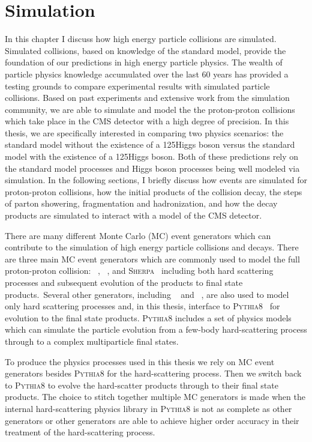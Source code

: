 \chapter{Simulation}
\label{sec:simulation}
In this chapter I discuss how high energy particle
collisions are simulated. Simulated collisions, based on knowledge of the standard model, provide 
the foundation of our predictions in high energy particle physics. 
The wealth of particle physics knowledge accumulated over the last 
60 years has provided a testing grounds to compare experimental results with
simulated particle collisions. Based on past experiments and extensive work from the simulation community,
we are able to simulate and model the the proton-proton collisions which take place in the
CMS detector with a high degree of precision. 
In this thesis, we are specifically interested in comparing two physics scenarios: the standard model 
without the existence of a 125\GeV Higgs boson versus the standard model with the existence
of a 125\GeV Higgs boson. Both of these predictions rely on the standard model processes and
Higgs boson processes being well modeled via simulation.
In the following sections, I briefly discuss how events are simulated for proton-proton collisions,
how the initial products of the collision decay, the steps of parton showering,
fragmentation and hadronization, and how the decay products are simulated
to interact with a model of the CMS detector.

There are many different Monte Carlo (MC) event generators which can contribute to the 
simulation of high energy particle collisions and decays. There are three main MC event
generators which are commonly used to model the full proton-proton collision: 
\PYTHIA~\cite{Sjostrand:2014zea}, \HERWIG~\cite{Bahr:2008pv}, and \textsc{Sherpa}~\cite{Gleisberg:2008ta}
including both hard scattering processes and subsequent evolution of the products to final 
state products. Several other generators, including \POWHEG~\cite{Alioli:2010xd,Frixione:2007vw}
and \MGAMCNLO~\cite{Alwall:2011uj,Alwall:2014hca}, 
are also used to model only hard scattering processes and, in this thesis, 
interface to \textsc{Pythia8}~\cite{Sjostrand:2014zea} for evolution to the final state products.
\textsc{Pythia8} includes a set of physics models
which can simulate the particle evolution from a few-body hard-scattering process through
to a complex multiparticle final states.

To produce the physics processes used in this
thesis we rely on MC event generators besides \textsc{Pythia8} for the hard-scattering process.
Then we switch back to \textsc{Pythia8} to evolve the hard-scatter products through 
to their final state products. The
choice to stitch together multiple MC generators is made when the internal
hard-scattering physics library in \textsc{Pythia8} is not as complete as other generators or other
generators are able to achieve higher order accuracy in their treatment of the
hard-scattering process.

